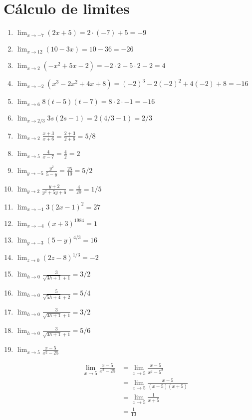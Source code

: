 \documentclass[a4paper, 12pt]{article}
\begin{document}
\section*{Cálculo de limites}
\begin{enumerate}
    \item $\lim_{x \to -7} (2x+5) = 2 \cdot (-7) + 5 = -9$
    \item $\lim_{x \to 12} (10 - 3x) = 10 - 36 = -26$
    \item $\lim_{x \to 2} (-x^2 + 5x - 2) = - 2\cdot 2 + 5\cdot 2 - 2 = 4$
    \item $\lim_{x \to -2} (x^3 - 2x^2 + 4x + 8) = (-2)^3 - 2(-2)^2 + 4(-2) + 8 = -16$
    \item $\lim_{x \to 6} 8 (t-5)(t-7) = 8\cdot 2 \cdot -1 = -16$
    \item $\lim_{x \to 2/3} 3s(2s-1) = 2(4/3 -1) = 2/3$
    \item $\lim_{x \to 2} \frac{x+3}{x+6} = \frac{2+3}{2+6} = 5/8$
    \item $\lim_{x \to 5} \frac{4}{x-7} = \frac{4}{2} = 2$
    \item $\lim_{y \to -5} \frac{y^2}{5-y} = \frac{25}{10} = 5/2$
    \item $\lim_{y \to 2} \frac{y+2}{y^2 + 5y +6} = \frac{4}{20} = 1/5$
    \item $\lim_{x \to -1} 3 (2x - 1)^2 = 27$
    \item $\lim_{x \to -4} (x+3)^{1984} = 1$
    \item $\lim_{y \to -3} (5-y)^{4/3} = 16$
    \item $\lim_{z \to 0} (2z - 8)^{1/3} = -2$
    \item $\lim_{h \to 0} \frac{3}{\sqrt{3h + 1} + 1} = 3/2$
    \item $\lim_{h \to 0} \frac{5}{\sqrt{5h + 4} + 2} = 5/4$
    \item $\lim_{h \to 0} \frac{3}{\sqrt{3h + 1} + 1} = 3/2$
    \item $\lim_{h \to 0} \frac{3}{\sqrt{3h + 1} + 1} = 5/6$
    
    \item $\lim_{x \to 5} \frac{x-5}{x^2 - 25}$
    
    \begin{align*}
        \lim_{x \to 5} \frac{x-5}{x^2 - 25} &= \lim_{x \to 5} \frac{x-5}{x^2 - 5^2}\\
        &= \lim_{x \to 5} \frac{x-5}{(x-5)(x+5)}\\
        &= \lim_{x \to 5} \frac{1}{x+5}\\
        &= \frac{1}{10}
    \end{align*}


\end{enumerate}
\end{document}
